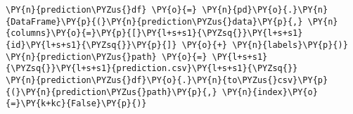 \documentclass[../main.tex]{subfiles}
\begin{document}
\begin{tcolorbox}[breakable, size=fbox, boxrule=1pt, pad at break*=1mm,colback=cellbackground, colframe=cellborder]
\begin{Verbatim}[commandchars=\\\{\}]
\PY{n}{prediction\PYZus{}df} \PY{o}{=} \PY{n}{pd}\PY{o}{.}\PY{n}{DataFrame}\PY{p}{(}\PY{n}{prediction\PYZus{}data}\PY{p}{,} \PY{n}{columns}\PY{o}{=}\PY{p}{[}\PY{l+s+s1}{\PYZsq{}}\PY{l+s+s1}{id}\PY{l+s+s1}{\PYZsq{}}\PY{p}{]} \PY{o}{+} \PY{n}{labels}\PY{p}{)}
\PY{n}{prediction\PYZus{}path} \PY{o}{=} \PY{l+s+s1}{\PYZsq{}}\PY{l+s+s1}{prediction.csv}\PY{l+s+s1}{\PYZsq{}}
\PY{n}{prediction\PYZus{}df}\PY{o}{.}\PY{n}{to\PYZus{}csv}\PY{p}{(}\PY{n}{prediction\PYZus{}path}\PY{p}{,} \PY{n}{index}\PY{o}{=}\PY{k+kc}{False}\PY{p}{)}
\end{Verbatim}
\end{tcolorbox}


\begin{center}
\end{center}
\end{document}
